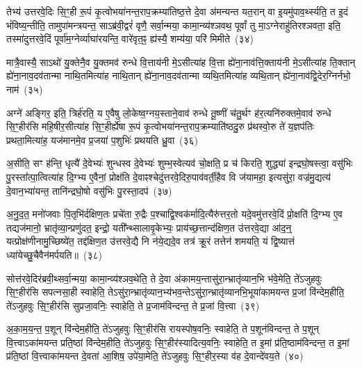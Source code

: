 {\anuvakamend[{यात॒वै ह॑वि॒र्धान॑ञ्च प॒शून्पा॒प्मना॒\-ऽष्टाद॑श च}]}

तेभ्य॑ उत्तरवे॒दिः सि॒ꣳ॒ही रू॒पं कृ॒त्वोभया॑नन्त॒राप॒क्रम्या॑तिष्ठ॒त्ते दे॒वा अ॑मन्यन्त यत॒रान् वा इ॒यमु॑पाव॒र्थ्स्यति॒ त इ॒दं भं॑विष्य॒न्तीति॒ तामुपा॑मन्त्रयन्त॒ साऽब्र॑वी॒द्वरं॑ वृणै॒ सर्वा॒न्मया॒ कामा॒न्व्य॑श्ञवथ॒ पूर्वां तु मा॒\-ऽग्नेराहु॑तिरश्ञवता॒ इति॒ तस्मा॑दुत्तरवे॒दिं पूर्वा॑म॒ग्नेर्व्याघा॑रयन्ति॒ वारे॑वृत॒ꣴ॒ ह्य॑स्यै॒ शम्य॑या॒ परि॑ मिमीते~(३४)\ip

मात्रै॒वास्यै॒ सा\-ऽथो॑ यु॒क्तेनै॒व यु॒क्तमव॑ रुन्धे वि॒त्ताय॑नी मे॒\-ऽसीत्या॑ह वि॒त्ता ह्ये॑ना॒नाव॑त्ति॒क्ताय॑नी मे॒\-ऽसीत्या॑ह ति॒क्तान् ह्ये॑ना॒नाव॒दव॑तान्मा नाथि॒तमित्या॑ह नाथि॒तान् ह्ये॑ना॒नाव॒दव॑तान्मा व्यथि॒तमित्या॑ह व्यथि॒तान् ह्ये॑ना॒नाव॑द्वि॒देर॒ग्निर्नभो॒ नाम॑~(३५)\ip

अग्ने॑ अङ्गिर॒ इति॒ त्रिर्\mbox{}ह॑रति॒ य ए॒वैषु लो॒केष्व॒ग्नय॒स्ताने॒वाव॑ रुन्धे तू॒ष्णीं च॑तु॒र्थꣳ ह॑र॒त्यनि॑रुक्तमे॒वाव॑ रुन्धे सि॒ꣳ॒हीर॑सि महि॒षीर॒सीत्या॑ह सि॒ꣳ॒हीर्\mbox{}ह्ये॑षा रू॒पं कृ॒त्वोभया॑नन्त॒राप॒क्रम्याति॑ष्ठदु॒रु प्र॑थस्वो॒रु ते॑ य॒ज्ञप॑तिः प्रथता॒मित्या॑ह॒ यज॑मानमे॒व प्र॒जया॑ प॒शुभिः॑ प्रथयति ध्रु॒वा~(३६)\ip

अ॒सीति॒ सꣳ ह॑न्ति॒ धृत्यै॑ दे॒वेभ्यः॑ शुन्धस्व दे॒वेभ्यः॑ शुम्भ॒स्वेत्यव॑ चो॒क्षति॒ प्र च॑ किरति॒ शुद्ध्या॑ इन्द्रघो॒षस्त्वा॒ वसु॑भिः पु॒रस्ता᳚त्पा॒त्वित्या॑ह दि॒ग्भ्य ए॒वैनां॒ प्रोक्ष॑ति दे॒वाꣴश्चेदु॑त्तरवे॒दिरु॒पाव॑वर्ती॒हैव वि ज॑यामहा॒ इत्यसु॑रा॒ वज्र॑मु॒द्यत्य॑ दे॒वान॒भ्या॑यन्त॒ तानि॑न्द्रघो॒षो वसु॑भिः पु॒रस्ता॒दप॑~(३७)\ip

अ॒नु॒द॒त॒ मनो॑जवाः पि॒तृभि॑र्दक्षिण॒तः प्रचे॑ता रु॒द्रैः प॒श्चाद्वि॒श्वक॑र्मादि॒त्यैरु॑त्तर॒तो यदे॒वमु॑त्तरवे॒दिं प्रो॒क्षति॑ दि॒ग्भ्य ए॒व तद्यज॑मानो॒ भ्रातृ॑व्या॒न्प्रणु॑दत॒ इन्द्रो॒ यती᳚न्थ्सालावृ॒केभ्यः॒ प्राय॑च्छ॒त्तान्द॑क्षिण॒त उ॑त्तरवे॒द्या आ॑द॒न्॒ यत्प्रोक्ष॑णीनामु॒च्छिष्ये॑त॒ तद्द॑क्षिण॒त उ॑त्तरवे॒द्यै नि न॑ये॒द्यदे॒व तत्र॑ क्रू॒रं तत्तेन॑ शमयति॒ यं द्वि॒ष्यात्तं ध्या॑येच्छु॒चैवैन॑मर्पयति॥~(३८)\ip

{\anuvakamend[{मि॒मी॒ते॒ नाम॑ ध्रु॒वा\-ऽप॑ शु॒चा त्रीणि॑ च}]}

सोत्त॑रवे॒दिर॑ब्रवी॒थ्सर्वा॒न्मया॒ कामा॒न्व्य॑श्ञव॒थेति॒ ते दे॒वा अ॑कामय॒न्तासु॑रा॒न्भ्रातृ॑व्यान॒भि भ॑वे॒मेति॒ ते॑\-ऽजुहवुः सि॒ꣳ॒हीर॑सि सपत्नसा॒ही स्वाहेति॒ ते\-ऽसु॑रा॒न्भ्रातृ॑व्यान॒भ्य॑भव॒न्ते\-ऽसु॑रा॒न्भ्रातृ॑व्यानभि॒भूया॑कामयन्त प्र॒जां वि॑न्देम॒हीति॒ ते॑\-ऽजुहवुः सि॒ꣳ॒हीर॑सि सुप्रजा॒वनिः॒ स्वाहेति॒ ते प्र॒जाम॑विन्दन्त॒ ते प्र॒जां वि॒त्त्वा~(३९)\ip

अ॒का॒म॒य॒न्त॒ प॒शून् वि॑न्देम॒हीति॒ ते॑\-ऽजुहवुः सि॒ꣳ॒हीर॑सि रायस्पोष॒वनिः॒ स्वाहेति॒ ते प॒शून॑विन्दन्त॒ ते प॒शून् वि॒त्त्वा\-ऽका॑मयन्त प्रति॒ष्ठां वि॑न्देम॒हीति॒ ते॑\-ऽजुहवुः सि॒ꣳ॒हीर॑स्यादित्य॒वनिः॒ स्वाहेति॒ त इ॒मां प्र॑ति॒ष्ठाम॑विन्दन्त॒ त इ॒मां प्र॑ति॒ष्ठां वि॒त्त्वाका॑मयन्त दे॒वता॑ आ॒शिष॒ उपे॑या॒मेति॒ ते॑\-ऽजुहवुः सि॒ꣳ॒हीर॒स्या व॑ह दे॒वान्दे॑वय॒ते~(४०)\ip

